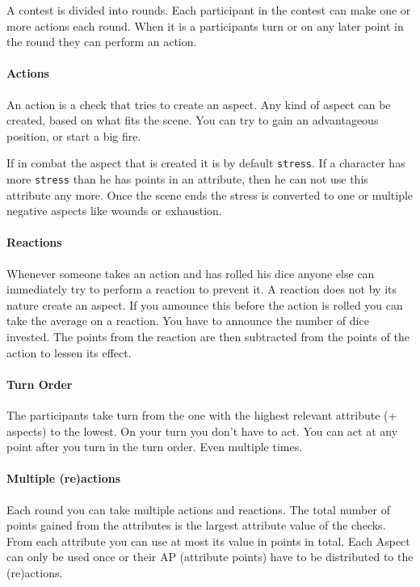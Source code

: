 \documentclass[11pt]{article}
\begin{document}
{A contest is divided into rounds. Each participant in the contest can make one or more actions each round. When it is a participants turn or on any later point in the round they can perform an action.

\paragraph*{Actions}
\label{sec:org29c050d}
An action is a check that tries to create an aspect. Any kind of aspect can be created, based on what fits the scene. You can try to gain an advantageous position, or start a big fire.

If in combat the aspect that is created it is by default \texttt{stress}. If a character has more \texttt{stress} than he has points in an attribute, then  he can not use this attribute any more. Once the scene ends the stress is converted to one or multiple negative aspects like wounds or exhaustion. 

\paragraph*{Reactions}
\label{sec:org8e9ae5e}
Whenever someone takes an action and has rolled his dice anyone else can immediately try to perform a reaction to prevent it. A reaction does not by its nature create an aspect. If you announce this before the action is rolled you can take the average on a reaction. You have to announce the number of dice invested. The points from the reaction are then subtracted from the points of the action to lessen its effect.

\paragraph*{Turn Order}
\label{sec:org30f9590}
The participants take turn from the one with the highest relevant attribute (+ aspects) to the lowest. On your turn you don't have to act. You can act at any point after you turn in the turn order. Even multiple times. 

\paragraph*{Multiple (re)actions}
\label{sec:org34287f8}
Each round you can take multiple actions and reactions. The total number of points gained from the attributes is the largest attribute value of the checks. From each attribute you can use at most its value in points in total. Each Aspect can only be used once or their AP (attribute points) have to be distributed to the (re)actions.

}
\end{document}
